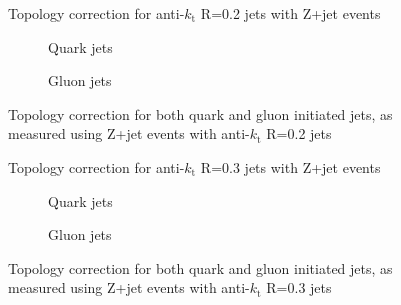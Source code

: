 \clearpage
\begin{figure}[!ht]
 \centering
 \caption[Topology correction for anti-$k_{\mathrm t}$ R=0.2 jets with Z+jet events]
 {\small Topology correction for anti-$k_{\mathrm t}$ R=0.2 jets with Z+jet events}
 \label{plot:ZJetTopoCorr2App}
\end{figure}

\begin{figure}[!ht]
 \centering
 \begin{subfigure}{.5\textwidth}
  \centering
  \caption{Quark jets}
 \end{subfigure}%
 \begin{subfigure}{.5\textwidth}
  \centering
  \caption{Gluon jets}
 \end{subfigure}
 \caption[Quark/gluon jet topology correction, anti-$k_{\mathrm t}$ R=0.2, Z+jet]
 {\small Topology correction for both quark and gluon initiated jets, as measured using Z+jet events with anti-$k_{\mathrm t}$ R=0.2 jets}
 \label{plot:ZJetTopoCorrFlav2App}
\end{figure}

\clearpage
\begin{figure}[!ht]
 \centering
 \caption[Topology correction for anti-$k_{\mathrm t}$ R=0.3 jets with Z+jet events]
 {\small Topology correction for anti-$k_{\mathrm t}$ R=0.3 jets with Z+jet events}
 \label{plot:ZJetTopoCorr3App}
\end{figure}

\begin{figure}[!ht]
 \centering
 \begin{subfigure}{.5\textwidth}
  \centering
  \caption{Quark jets}
 \end{subfigure}%
 \begin{subfigure}{.5\textwidth}
  \centering
  \caption{Gluon jets}
 \end{subfigure}
 \caption[Quark/gluon jet topology correction, anti-$k_{\mathrm t}$ R=0.3, Z+jet]
 {\small Topology correction for both quark and gluon initiated jets, as measured using Z+jet events with anti-$k_{\mathrm t}$ R=0.3 jets}
 \label{plot:ZJetTopoCorrFlav3App}
\end{figure}


